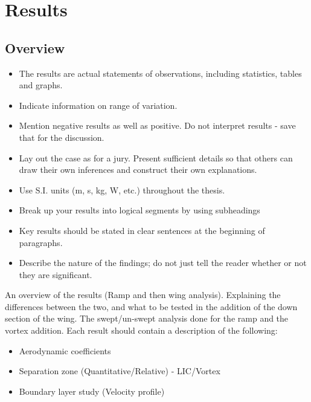 \chapter{Results}
\section{Overview}
\begin{itemize}
  \item The results are actual statements of observations, including statistics, tables and graphs.
  \item Indicate information on range of variation.
  \item Mention negative results as well as positive. Do not interpret results - save that for the discussion.
  \item Lay out the case as for a jury. Present sufficient details so that others can draw their own inferences and construct their own explanations.
  \item Use S.I. units (m, s, kg, W, etc.) throughout the thesis.
  \item Break up your results into logical segments by using subheadings
  \item Key results should be stated in clear sentences at the beginning of paragraphs.
  \item Describe the nature of the findings; do not just tell the reader whether or not they are significant.
\end{itemize}
An overview of the results (Ramp and then wing analysis).
Explaining the differences between the two, and what to be tested in the addition of the down section of the wing. The swept/un-swept analysis done for the ramp and the vortex addition.
Each result should contain a description of the following:
\begin{itemize}
 \item Aerodynamic coefficients
 \item Separation zone (Quantitative/Relative) - LIC/Vortex
 \item Boundary layer study (Velocity profile)
\end{itemize}




